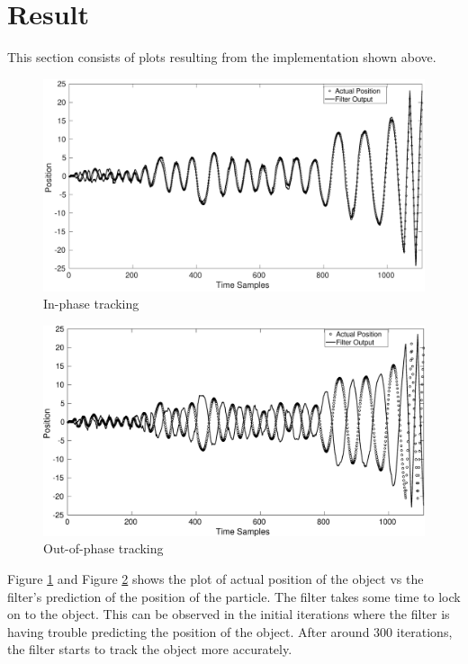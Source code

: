 \documentclass[12pt]{article}
\begin{document}
\section{Result}
This section consists of plots resulting from the implementation shown above. \\

\begin{figure}[b]
\centering
	\includegraphics[scale = 0.3]{./Figures/inphase.eps}
	\caption{In-phase tracking}
	\label{fig:inphase}
\end{figure}

\begin{figure}[t]
\centering
	\includegraphics[scale = 0.3]{./Figures/outphase.eps}
	\caption{Out-of-phase tracking}
	\label{fig:outphase}
\end{figure}

Figure \ref{fig:inphase} and Figure \ref{fig:outphase} shows the plot of actual position of the object vs the filter's prediction of the position of the particle. The filter takes some time to lock on to the object. This can be observed in the initial iterations where the filter is having trouble predicting the position of the object. After around 300 iterations, the filter starts to track the object more accurately.\\
\end{document}
